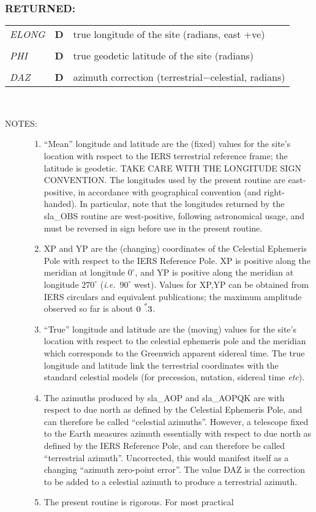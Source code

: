 \documentclass[11pt,twoside,nolof]{starlink}
\providecommand{\arcsec}[2] {\arcseci{#1}$\hspace{-0.4em}.#2$}
\providecommand{\arcseci}[1] {$#1\hspace{-0.05em}$\raisebox{-0.5ex}
                         {$^{'\hspace{-0.1em}'}$}}
\newcommand{\args}[2]{
  \subsubsection*{#1:}
     \begin{tabular}{p{7em}p{6em}p{22em}}
       #2
     \end{tabular}\\
}
\newcommand{\spec}[3]
{
  \emph{{#1}} & {\textbf{\mbox{#2}}} & {#3} \\
}
\newcommand{\notes}[1]
 {
   \begin{description}
     \item[NOTES:]
         #1
   \end{description}
}
\begin{document}
\args{RETURNED}
{
 \spec{ELONG}{D}{true longitude of the site (radians, east +ve)} \\
 \spec{PHI}{D}{true geodetic latitude of the site (radians)} \\
 \spec{DAZ}{D}{azimuth correction (terrestrial$-$celestial, radians)}
}
\notes
{
\begin{enumerate}
\item ``Mean'' longitude and latitude are the (fixed) values for the
      site's location with respect to the IERS terrestrial reference
      frame;  the latitude is geodetic.  TAKE CARE WITH THE LONGITUDE
      SIGN CONVENTION.  The longitudes used by the present routine
      are east-positive, in accordance with geographical convention
      (and right-handed).  In particular, note that the longitudes
      returned by the sla\_OBS routine are west-positive, following
      astronomical usage, and must be reversed in sign before use in
      the present routine.
\item XP and YP are the (changing) coordinates of the Celestial
      Ephemeris Pole with respect to the IERS Reference Pole.
      XP is positive along the meridian at longitude $0^\circ$,
      and YP is positive along the meridian at longitude
      $270^\circ$ (\textit{i.e.}\ $90^\circ$ west).  Values for XP,YP can
      be obtained from IERS circulars and equivalent publications;
      the maximum amplitude observed so far is about \arcsec{0}{3}.
\item ``True'' longitude and latitude are the (moving) values for
      the site's location with respect to the celestial ephemeris
      pole and the meridian which corresponds to the Greenwich
      apparent sidereal time.  The true longitude and latitude
      link the terrestrial coordinates with the standard celestial
      models (for precession, nutation, sidereal time \textit{etc}).
\item The azimuths produced by sla\_AOP and sla\_AOPQK are with
      respect to due north as defined by the Celestial Ephemeris
      Pole, and can therefore be called ``celestial azimuths''.
      However, a telescope fixed to the Earth measures azimuth
      essentially with respect to due north as defined by the
      IERS Reference Pole, and can therefore be called ``terrestrial
      azimuth''.  Uncorrected, this would manifest itself as a
      changing ``azimuth zero-point error''.  The value DAZ is the
      correction to be added to a celestial azimuth to produce
      a terrestrial azimuth.
\item The present routine is rigorous.  For most practical

\end{enumerate}}
\end{document}
